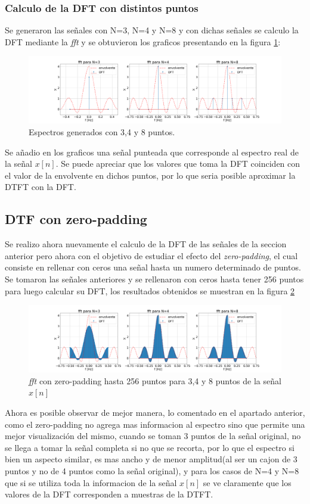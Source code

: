 \documentclass[letterpaper]{article}
\begin{document}
\subsubsection{Calculo de la DFT con distintos puntos}    
Se generaron las señales con N=3, N=4 y N=8 y con dichas señales se calculo la DFT mediante la \textit{fft} y se obtuvieron los graficos presentando en la figura \ref{fig.3b}:

\begin{figure}[htb]
\centering
\includegraphics[width=\textwidth]{Img/punto_3_b.png}
\caption{Espectros generados con 3,4 y 8 puntos.}
\label{fig.3b}
\end{figure}

Se añadio en los graficos una señal punteada que corresponde al espectro real de la señal $x[n]$.
Se puede apreciar que los valores que toma la DFT coinciden con el valor de la envolvente en dichos puntos, por lo que seria posible aproximar la DTFT con la DFT.

\subsection{DTF con zero-padding}
Se realizo ahora nuevamente el calculo de la DFT de las señales de la seccion anterior pero ahora con el objetivo de estudiar el efecto del \textit{zero-padding}, el cual consiste en rellenar con ceros una señal hasta un numero determinado de puntos. Se tomaron las señales anteriores y se rellenaron con ceros hasta tener 256 puntos para luego calcular su DFT, los resultados obtenidos se muestran en la figura \ref{fig.1c}
\begin{figure}[htb]
\centering
\includegraphics[width=\textwidth]{Img/punto_3_c.png}
\caption{\textit{fft} con zero-padding hasta 256 puntos para 3,4 y 8 puntos de la señal $x[n]$}
\label{fig.1c}
\end{figure}
Ahora es posible observar de mejor manera, lo comentado en el apartado anterior, como el zero-padding no agrega mas informacion al espectro sino que permite una mejor visualización del mismo, cuando se toman 3 puntos de la señal original, no se llega a tomar la señal completa si no que se recorta, por lo que el espectro si bien un aspecto similar, es mas ancho y de menor amplitud(al ser un cajon de 3 puntos y no de 4 puntos como la señal original), y para los casos de N=4 y N=8 que si se utiliza toda la informacion de la señal $x[n]$ se ve claramente que los valores de la DFT corresponden a muestras de la DTFT.
\end{document}

